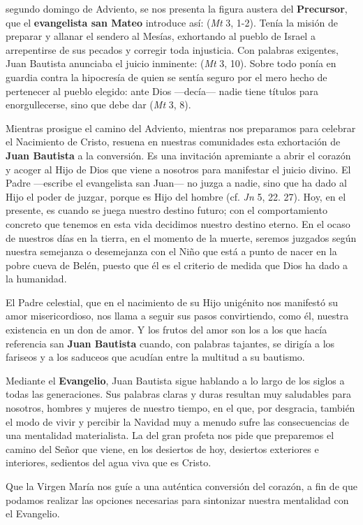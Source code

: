 \begin{body}
	 segundo domingo de Adviento, se nos presenta la figura austera del \textbf{Precursor}, que el \textbf{evangelista san Mateo} introduce así:  (\emph{Mt} 3, 1-2). Tenía la misión de preparar y allanar el sendero al Mesías, exhortando al pueblo de Israel a arrepentirse de sus pecados y corregir toda injusticia. Con palabras exigentes, Juan Bautista anunciaba el juicio inminente:  (\emph{Mt} 3, 10). Sobre todo ponía en guardia contra la hipocresía de quien se sentía seguro por el mero hecho de pertenecer al pueblo elegido: ante Dios ---decía--- nadie tiene títulos para enorgullecerse, sino que debe dar  (\emph{Mt} 3, 8).
	
	Mientras prosigue el camino del Adviento, mientras nos preparamos para celebrar el Nacimiento de Cristo, resuena en nuestras comunidades esta exhortación de \textbf{Juan Bautista} a la conversión. Es una invitación apremiante a abrir el corazón y acoger al Hijo de Dios que viene a nosotros para manifestar el juicio divino. El Padre ---escribe el evangelista san Juan--- no juzga a nadie, sino que ha dado al Hijo el poder de juzgar, porque es Hijo del hombre (cf. \emph{Jn} 5, 22. 27). Hoy, en el presente, es cuando se juega nuestro destino futuro; con el comportamiento concreto que tenemos en esta vida decidimos nuestro destino eterno. En el ocaso de nuestros días en la tierra, en el momento de la muerte, seremos juzgados según nuestra semejanza o desemejanza con el Niño que está a punto de nacer en la pobre cueva de Belén, puesto que él es el criterio de medida que Dios ha dado a la humanidad.
	
	El Padre celestial, que en el nacimiento de su Hijo unigénito nos manifestó su amor misericordioso, nos llama a seguir sus pasos convirtiendo, como él, nuestra existencia en un don de amor. Y los frutos del amor son los  a los que hacía referencia san \textbf{Juan Bautista} cuando, con palabras tajantes, se dirigía a los fariseos y a los saduceos que acudían entre la multitud a su bautismo.
	
	Mediante el \textbf{Evangelio}, Juan Bautista sigue hablando a lo largo de los siglos a todas las generaciones. Sus palabras claras y duras resultan muy saludables para nosotros, hombres y mujeres de nuestro tiempo, en el que, por desgracia, también el modo de vivir y percibir la Navidad muy a menudo sufre las consecuencias de una mentalidad materialista. La  del gran profeta nos pide que preparemos el camino del Señor que viene, en los desiertos de hoy, desiertos exteriores e interiores, sedientos del agua viva que es Cristo.
	
	Que la Virgen María nos guíe a una auténtica conversión del corazón, a fin de que podamos realizar las opciones necesarias para sintonizar nuestra mentalidad con el Evangelio.
\end{body}

